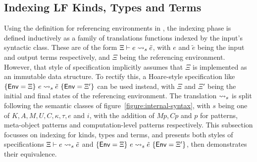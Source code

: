 


\subsection{Indexing \acs{LF} Kinds, Types and Terms}

Using the definition for referencing environments in \Beluga, the indexing phase is defined inductively as a family of translations functions indexed by the input's syntactic class.
These are of the form $\Xi \vdash e \rightsquigarrow_{s} \tilde e$, with $e$ and $\tilde e$ being the input and output terms respectively, and $\Xi$ being the referencing environment.
However, that style of specification implicitly assumes that $\Xi$ is implemented as an immutable data structure.
To rectify this, a Hoare-style specification like $\{\mathsf{Env} = \Xi\}\ e \rightsquigarrow_{s} \tilde e\ \{\mathsf{Env} = \Xi'\}$ can be used instead, with $\Xi$ and $\Xi'$ being the initial and final states of the referencing environment.
The translation $\rightsquigarrow_{s}$ is split following the semantic classes of figure~\ref{figure:internal-syntax}, with $s$ being one of $K, A, M, U, C, \kappa, \tau, e$ and $i$, with the addition of $Mp, Cp$ and $p$ for \LF patterns, meta-object patterns and computation-level patterns respectively.
This subsection focusses on indexing for \LF kinds, types and terms, and presents both styles of specifications $\Xi \vdash e \rightsquigarrow_{s} \tilde e$ and $\{\mathsf{Env} = \Xi\}\ e \rightsquigarrow_{s} \tilde e\ \{\mathsf{Env} = \Xi'\}$, then demonstrates their equivalence.

